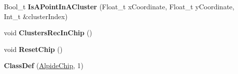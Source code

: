 \begin{DoxyCompactItemize}
Bool\+\_\+t {\bfseries Is\+A\+Point\+In\+A\+Cluster} (Float\+\_\+t x\+Coordinate, Float\+\_\+t y\+Coordinate, Int\+\_\+t \&cluster\+Index)
\item 
\mbox{\label{class_alpide_chip_a993814fa745c75cc72fc28e758a08d5e}} 
void {\bfseries Clusters\+Rec\+In\+Chip} ()
\item 
\mbox{\label{class_alpide_chip_aaeb6c6d98741407f7a6d0834476cd359}} 
void {\bfseries Reset\+Chip} ()
\item 
\mbox{\label{class_alpide_chip_aba0d7fcac933f1a7012649338432b623}} 
{\bfseries Class\+Def} (\mbox{\hyperlink{class_alpide_chip}{Alpide\+Chip}}, 1)
\end{DoxyCompactItemize}
